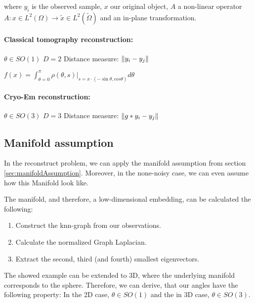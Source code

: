 where $y_i$ is the observed sample, $x$ our original object, $A$ a non-linear operator 
$A: x \in L^2(\Omega) \rightarrow \tilde{x} \in L^2(\tilde{\Omega})$
and an in-plane transformation.


\paragraph{Classical tomography reconstruction:}

$\theta \in SO(1)$
$D = 2$
Distance measure: $\left\lVert y_i - y_j\right\rVert$

$f(x) = \int_{\theta = 0}^{\pi} \rho(\theta, s) |_{s=x \cdot (- \sin \theta, cos \theta) } d \theta$



\paragraph{Cryo-Em reconstruction:}

$\theta \in SO(3)$
$D = 3$
Distance measure: $\left\lVert g * y_i - y_j\right\rVert$


\subsection{Manifold assumption}
In the reconstruct problem, we can apply the manifold assumption from section \ref{sec:manifoldAssumption}.
Moreover, in the none-noisy case, we can even assume how this Manifold look like.

The manifold, and therefore, a low-dimensional embedding, can be calculated the following:

\begin{enumerate}
    \item Construct the knn-graph from our observations.
    \item Calculate the normalized Graph Laplacian.
    \item Extract the second, third (and fourth) smallest eigenvectors.
\end{enumerate}

The showed example can be extended to 3D, where the underlying manifold corresponds to the sphere.
Therefore, we can derive, that our angles have the following property:
In the 2D case, $\theta \in SO(1)$ and the in 3D case, $\theta \in SO(3)$.







